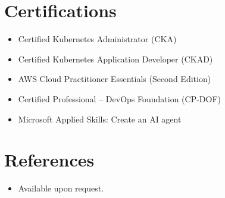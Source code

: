 \documentclass[11pt,a4paper,sans]{moderncv}
\begin{document}
\section{Certifications}
\vspace{1pt}
\begin{itemize}
\item{Certified Kubernetes Administrator (CKA)}
\item{Certified Kubernetes Application Developer (CKAD)}
\item{AWS Cloud Practitioner Essentials (Second Edition)}
\item{Certified Professional -- DevOps Foundation (CP-DOF)}
\item{Microsoft Applied Skills: Create an AI agent}
\end{itemize}


\section{References}
\vspace{1pt}
\begin{itemize}
\item{Available upon request.}
\end{itemize}
\end{document}
